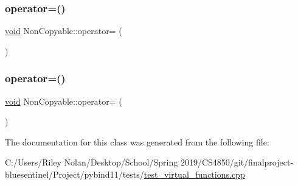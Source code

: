 \mbox{\label{class_non_copyable_aaf9b12dcaae80c9d304df7a941d4e21f}} 
\subsubsection{\texorpdfstring{operator=()}{operator=()}\hspace{0.1cm}{\footnotesize\ttfamily [1/2]}}
{\footnotesize\ttfamily \mbox{\hyperlink{_s_d_l__opengles2__gl2ext_8h_ae5d8fa23ad07c48bb609509eae494c95}{void}} Non\+Copyable\+::operator= (\begin{DoxyParamCaption}\item[{const \mbox{\hyperlink{class_non_copyable}{Non\+Copyable}} \&}]{ }\end{DoxyParamCaption})\hspace{0.3cm}{\ttfamily [delete]}}

\mbox{\label{class_non_copyable_a32e47f60a7c07436b9801f4d341eac3d}} 
\subsubsection{\texorpdfstring{operator=()}{operator=()}\hspace{0.1cm}{\footnotesize\ttfamily [2/2]}}
{\footnotesize\ttfamily \mbox{\hyperlink{_s_d_l__opengles2__gl2ext_8h_ae5d8fa23ad07c48bb609509eae494c95}{void}} Non\+Copyable\+::operator= (\begin{DoxyParamCaption}\item[{\mbox{\hyperlink{class_non_copyable}{Non\+Copyable}} \&\&}]{ }\end{DoxyParamCaption})\hspace{0.3cm}{\ttfamily [delete]}}



The documentation for this class was generated from the following file\+:\begin{DoxyCompactItemize}
\item 
C\+:/\+Users/\+Riley Nolan/\+Desktop/\+School/\+Spring 2019/\+C\+S4850/git/finalproject-\/bluesentinel/\+Project/pybind11/tests/\mbox{\hyperlink{test__virtual__functions_8cpp}{test\+\_\+virtual\+\_\+functions.\+cpp}}\end{DoxyCompactItemize}
